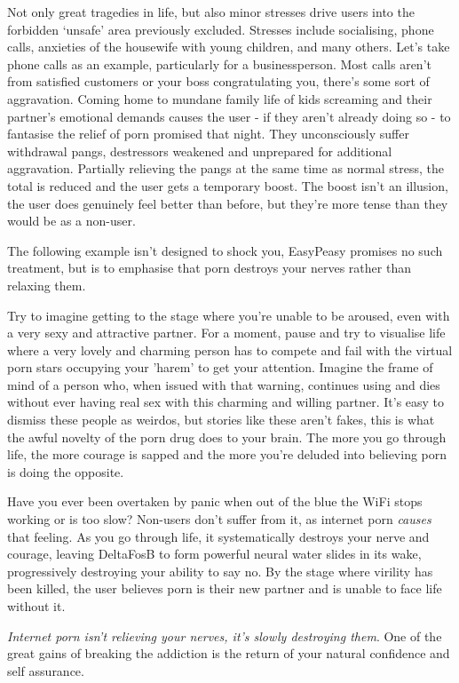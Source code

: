 \documentclass[
]{book}
\begin{document}
Not only great tragedies in life, but also minor stresses drive users into the forbidden `unsafe' area previously excluded. Stresses include socialising, phone calls, anxieties of the housewife with young children, and many others. Let's take phone calls as an example, particularly for a businessperson. Most calls aren't from satisfied customers or your boss congratulating you, there's some sort of aggravation. Coming home to mundane family life of kids screaming and their partner's emotional demands causes the user - if they aren't already doing so - to fantasise the relief of porn promised that night. They unconsciously suffer withdrawal pangs, destressors weakened and unprepared for additional aggravation. Partially relieving the pangs at the same time as normal stress, the total is reduced and the user gets a temporary boost. The boost isn't an illusion, the user does genuinely feel better than before, but they're more tense than they would be as a non-user.

The following example isn't designed to shock you, EasyPeasy promises no such treatment, but is to emphasise that porn destroys your nerves rather than relaxing them.

Try to imagine getting to the stage where you're unable to be aroused, even with a very sexy and attractive partner. For a moment, pause and try to visualise life where a very lovely and charming person has to compete and fail with the virtual porn stars occupying your 'harem' to get your attention. Imagine the frame of mind of a person who, when issued with that warning, continues using and dies without ever having real sex with this charming and willing partner. It's easy to dismiss these people as weirdos, but stories like these aren't fakes, this is what the awful novelty of the porn drug does to your brain. The more you go through life, the more courage is sapped and the more you're deluded into believing porn is doing the opposite.

Have you ever been overtaken by panic when out of the blue the WiFi stops working or is too slow? Non-users don't suffer from it, as internet porn \emph{causes} that feeling. As you go through life, it systematically destroys your nerve and courage, leaving DeltaFosB to form powerful neural water slides in its wake, progressively destroying your ability to say no. By the stage where virility has been killed, the user believes porn is their new partner and is unable to face life without it.

\emph{Internet porn isn't relieving your nerves, it's slowly destroying them}. One of the great gains of breaking the addiction is the return of your natural confidence and self assurance.
\end{document}
